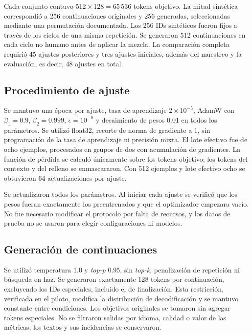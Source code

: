 \documentclass[12pt,letterpaper]{article}
\begin{document}
Cada conjunto contuvo \(512\times128=65\,536\) tokens objetivo. La mitad
sintética correspondió a 256 continuaciones originales y 256 generadas,
seleccionadas mediante una permutación documentada. Los 256 IDs sintéticos
fueron fijos a través de los ciclos de una misma repetición. Se generaron
512 continuaciones en cada ciclo no humano antes de aplicar la mezcla.
La comparación completa
requirió 45 ajustes posteriores y tres ajustes iniciales, además del
muestreo y la evaluación, es decir, 48 ajustes en total.

\subsection{Procedimiento de ajuste}

Se mantuvo una época por ajuste, tasa de aprendizaje \(2\times10^{-5}\),
AdamW con \(\beta_1=0.9\), \(\beta_2=0.999\), \(\epsilon=10^{-8}\)
y decaimiento de pesos 0.01 en todos los parámetros. Se utilizó float32,
recorte de norma de gradiente a 1, sin programación de la tasa de aprendizaje
ni precisión mixta. El lote efectivo fue de ocho ejemplos, procesados en
grupos de dos con acumulación de gradientes.
La función de pérdida se calculó únicamente sobre los tokens objetivo;
los tokens del contexto y del relleno se enmascararon. Con 512 ejemplos y
lote efectivo ocho se obtuvieron 64 actualizaciones por ajuste.

Se actualizaron todos los parámetros. Al iniciar cada ajuste se verificó
que los pesos fueran exactamente los preentrenados y que el optimizador
empezara vacío. No fue necesario modificar el protocolo por falta de
recursos, y los datos de prueba no se usaron para elegir configuraciones
ni modelos.

\subsection{Generación de continuaciones}

Se utilizó temperatura \(1.0\) y \textit{top-p} \(0.95\), sin
\textit{top-k}, penalización de repetición ni búsqueda en haz. Se generaron
exactamente 128 tokens por continuación, excluyendo los IDs especiales,
incluido el de finalización. Esta restricción, verificada en el piloto,
modifica la distribución de decodificación y se mantuvo constante entre
condiciones. Los objetivos originales se tomaron sin agregar tokens
especiales. No se filtraron salidas por idioma, calidad o valor de las
métricas; los textos y sus incidencias se conservaron.
\end{document}
